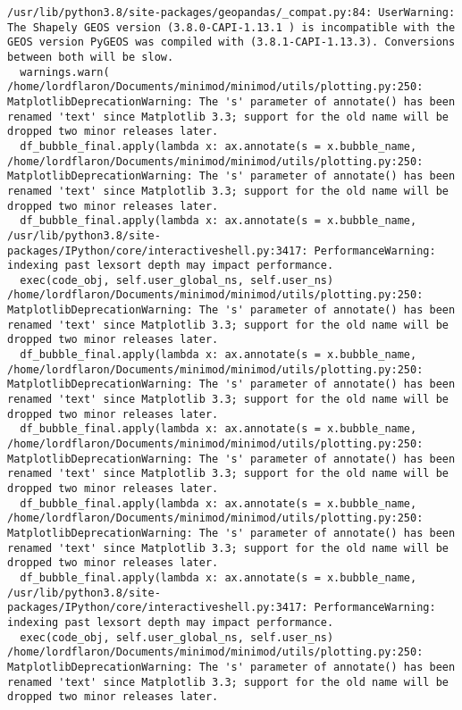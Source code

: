 \documentclass[
]{article}
\begin{document}
\begin{verbatim}
/usr/lib/python3.8/site-packages/geopandas/_compat.py:84: UserWarning: The Shapely GEOS version (3.8.0-CAPI-1.13.1 ) is incompatible with the GEOS version PyGEOS was compiled with (3.8.1-CAPI-1.13.3). Conversions between both will be slow.
  warnings.warn(
/home/lordflaron/Documents/minimod/minimod/utils/plotting.py:250: MatplotlibDeprecationWarning: The 's' parameter of annotate() has been renamed 'text' since Matplotlib 3.3; support for the old name will be dropped two minor releases later.
  df_bubble_final.apply(lambda x: ax.annotate(s = x.bubble_name,
/home/lordflaron/Documents/minimod/minimod/utils/plotting.py:250: MatplotlibDeprecationWarning: The 's' parameter of annotate() has been renamed 'text' since Matplotlib 3.3; support for the old name will be dropped two minor releases later.
  df_bubble_final.apply(lambda x: ax.annotate(s = x.bubble_name,
/usr/lib/python3.8/site-packages/IPython/core/interactiveshell.py:3417: PerformanceWarning: indexing past lexsort depth may impact performance.
  exec(code_obj, self.user_global_ns, self.user_ns)
/home/lordflaron/Documents/minimod/minimod/utils/plotting.py:250: MatplotlibDeprecationWarning: The 's' parameter of annotate() has been renamed 'text' since Matplotlib 3.3; support for the old name will be dropped two minor releases later.
  df_bubble_final.apply(lambda x: ax.annotate(s = x.bubble_name,
/home/lordflaron/Documents/minimod/minimod/utils/plotting.py:250: MatplotlibDeprecationWarning: The 's' parameter of annotate() has been renamed 'text' since Matplotlib 3.3; support for the old name will be dropped two minor releases later.
  df_bubble_final.apply(lambda x: ax.annotate(s = x.bubble_name,
/home/lordflaron/Documents/minimod/minimod/utils/plotting.py:250: MatplotlibDeprecationWarning: The 's' parameter of annotate() has been renamed 'text' since Matplotlib 3.3; support for the old name will be dropped two minor releases later.
  df_bubble_final.apply(lambda x: ax.annotate(s = x.bubble_name,
/home/lordflaron/Documents/minimod/minimod/utils/plotting.py:250: MatplotlibDeprecationWarning: The 's' parameter of annotate() has been renamed 'text' since Matplotlib 3.3; support for the old name will be dropped two minor releases later.
  df_bubble_final.apply(lambda x: ax.annotate(s = x.bubble_name,
/usr/lib/python3.8/site-packages/IPython/core/interactiveshell.py:3417: PerformanceWarning: indexing past lexsort depth may impact performance.
  exec(code_obj, self.user_global_ns, self.user_ns)
/home/lordflaron/Documents/minimod/minimod/utils/plotting.py:250: MatplotlibDeprecationWarning: The 's' parameter of annotate() has been renamed 'text' since Matplotlib 3.3; support for the old name will be dropped two minor releases later.

\end{verbatim}
\end{document}
